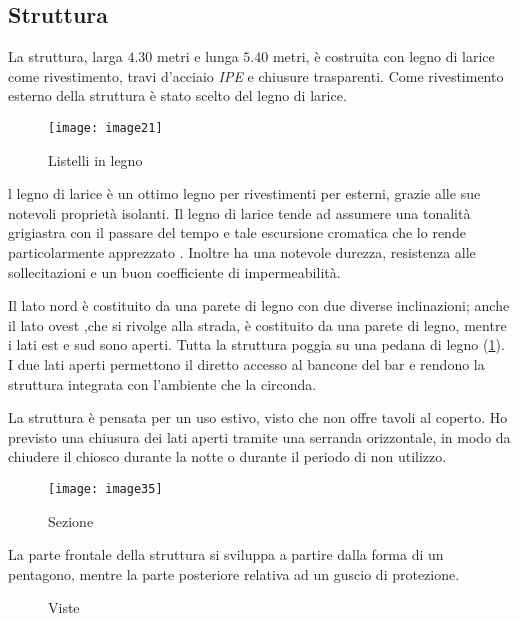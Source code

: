\clearpage
\subsection{Struttura}


La struttura, larga $4.30$ metri e lunga $5.40$ metri, è costruita con legno di larice come rivestimento, travi  d'acciaio \textit{IPE}  e chiusure trasparenti. Come rivestimento esterno della struttura è stato scelto del legno di larice.

\begin{wrapfigure}[11]{r}{0.5\textwidth}
	\centering
	\texttt{[image: image21]}
	\caption{Listelli in legno}
\end{wrapfigure}

l legno di larice è un ottimo legno per rivestimenti per esterni, grazie alle sue notevoli proprietà isolanti. Il legno di larice tende ad assumere una tonalità grigiastra con il passare del tempo e tale escursione cromatica che lo rende particolarmente apprezzato . Inoltre ha una notevole durezza, resistenza alle sollecitazioni e un buon coefficiente di impermeabilità. 

Il lato nord è costituito da una parete di legno con due diverse inclinazioni; anche il lato ovest ,che si rivolge alla strada, è costituito da una parete di legno, mentre i lati est e sud sono aperti. Tutta la struttura poggia su una pedana di legno (\cref{fig:pedana}). I due lati aperti permettono il diretto accesso al bancone del bar e rendono la struttura integrata con l’ambiente che la circonda. 

La struttura è pensata per un uso estivo, visto che non offre tavoli al coperto. 
Ho previsto una chiusura dei lati aperti tramite una serranda orizzontale, 
in modo da chiudere il chiosco durante la notte o durante il periodo di non utilizzo. 

\begin{figure}[H]
	\centering
	\texttt{[image: image35]}
	\caption{Sezione}
	\label{fig:pedana}
\end{figure}

\clearpage
La parte frontale della struttura si sviluppa a partire dalla forma di un pentagono, mentre la parte posteriore relativa ad un guscio di protezione.
\begin{figure}[H]
	\captionsetup[subfloat]{farskip=2pt,captionskip=8pt}
	\centering
	\hspace{1cm}
	\caption{Viste}
\end{figure}

